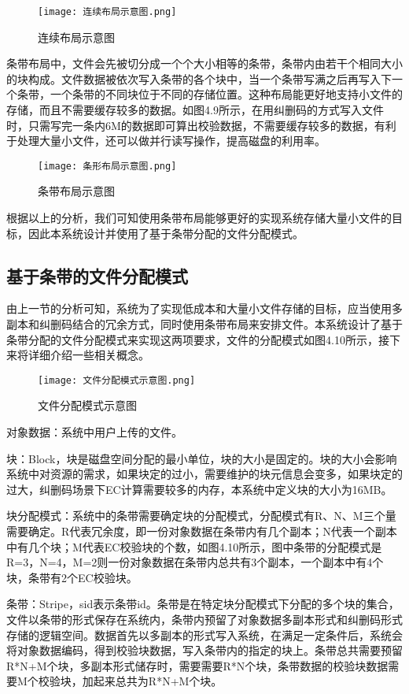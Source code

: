 \begin{figure}[h]
  \centering
  \texttt{[image: 连续布局示意图.png]}
  \caption{连续布局示意图}
\end{figure}

条带布局中，文件会先被切分成一个个大小相等的条带，条带内由若干个相同大小的块构成。文件数据被依次写入条带的各个块中，当一个条带写满之后再写入下一个条带，一个条带的不同块位于不同的存储位置。这种布局能更好地支持小文件的存储，而且不需要缓存较多的数据。如图4.9所示，在用纠删码的方式写入文件时，只需写完一条内6M的数据即可算出校验数据，不需要缓存较多的数据，有利于处理大量小文件，还可以做并行读写操作，提高磁盘的利用率。

\begin{figure}[h]
  \centering
  \texttt{[image: 条形布局示意图.png]}
  \caption{条带布局示意图}
\end{figure}

根据以上的分析，我们可知使用条带布局能够更好的实现系统存储大量小文件的目标，因此本系统设计并使用了基于条带分配的文件分配模式。

\subsection{基于条带的文件分配模式}%
由上一节的分析可知，系统为了实现低成本和大量小文件存储的目标，应当使用多副本和纠删码结合的冗余方式，同时使用条带布局来安排文件。本系统设计了基于条带分配的文件分配模式来实现这两项要求，文件的分配模式如图4.10所示，接下来将详细介绍一些相关概念。

\begin{figure}[h]
    \centering
    \texttt{[image: 文件分配模式示意图.png]}
    \caption{文件分配模式示意图}
  \end{figure}

对象数据：系统中用户上传的文件。

块：Block，块是磁盘空间分配的最小单位，块的大小是固定的。块的大小会影响系统中对资源的需求，如果块定的过小，需要维护的块元信息会变多，如果块定的过大，纠删码场景下EC计算需要较多的内存，本系统中定义块的大小为16MB。

块分配模式：系统中的条带需要确定块的分配模式，分配模式有R、N、M三个量需要确定。R代表冗余度，即一份对象数据在条带内有几个副本；N代表一个副本中有几个块；M代表EC校验块的个数，如图4.10所示，图中条带的分配模式是R=3，N=4，M=2则一份对象数据在条带内总共有3个副本，一个副本中有4个块，条带有2个EC校验块。

条带：Stripe，sid表示条带id。条带是在特定块分配模式下分配的多个块的集合，文件以条带的形式保存在系统内，条带内预留了对象数据多副本形式和纠删码形式存储的逻辑空间。数据首先以多副本的形式写入系统，在满足一定条件后，系统会将对象数据编码，得到校验块数据，写入条带内的指定的块上。条带总共需要预留R*N+M个块，多副本形式储存时，需要需要R*N个块，条带数据的校验块数据需要M个校验块，加起来总共为R*N+M个块。

